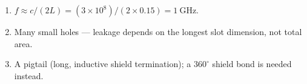 \begin{enumerate}[leftmargin=1.6em,itemsep=2pt]
\item $f \approx c/(2L) = (3\times10^8)/(2\times0.15) = 1\ \text{GHz}$.
\item Many small holes --- leakage depends on the longest slot dimension, not total area.
\item A pigtail (long, inductive shield termination); a $360^{\circ}$ shield bond is needed instead.
\end{enumerate}
